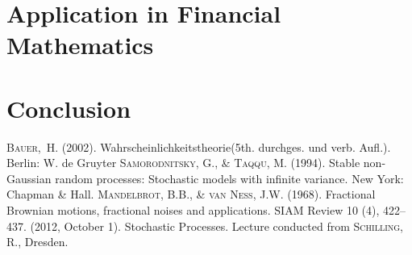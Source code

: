 \documentclass[a4paper, twoside, 11pt]{article}
\theoremstyle{definition}
\begin{document}
\section{Application in Financial Mathematics}

\newpage

\section{Conclusion}

\newpage

\fancyhead[LO, RE]{}
\begin{thebibliography}{99}
	 \textsc{Bauer,~H.} (2002). Wahrscheinlichkeitstheorie(5th. durchges. und verb. Aufl.). Berlin: W. de Gruyter
	 \textsc{Samorodnitsky, G., \& Taqqu, M.} (1994). Stable non-Gaussian random processes: Stochastic models with infinite variance. New York: Chapman \& Hall.
	 \textsc{Mandelbrot, B.B., \& van Ness, J.W.} (1968). Fractional Brownian motions, fractional noises and applications. SIAM Review 10 (4), 422–437.
	 (2012, October 1). Stochastic Processes. Lecture conducted from \textsc{Schilling, R.}, Dresden.
\end{thebibliography}
\newpage
\end{document}
